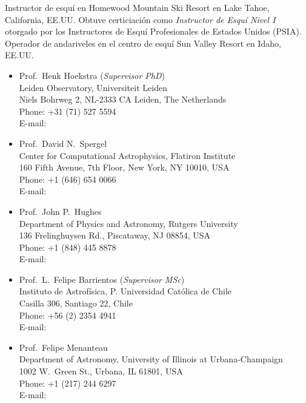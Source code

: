 \documentclass[11pt]{article}
\begin{document}

 Instructor de esquí en Homewood Mountain Ski Resort en 
Lake Tahoe, California, EE.UU. Obtuve certiciación como \emph{Instructor de 
Esquí Nivel I} otorgado por los Instructores de Esquí Profesionales de Estados 
Unidos (PSIA).\\
 Operador de andariveles en el centro de 
esquí Sun Valley Resort en Idaho, EE.UU.\\



\begin{itemize}
 \item Prof.~Henk Hoekstra (\textit{Supervisor PhD})\\
       Leiden Observatory, Universiteit Leiden\\
       Niels Bohrweg 2, NL-2333 CA Leiden, The Netherlands\\
       Phone: +31 (71) 527 5594\\
       E-mail: 
 \item Prof.~David N.~Spergel\\
       Center for Computational Astrophysics, Flatiron Institute\\
       160 Fifth Avenue, 7th Floor, New York, NY 10010, USA\\
       Phone: +1 (646) 654 0066\\
       E-mail: 
 \item Prof.~John P.~Hughes\\
       Department of Physics and Astronomy, Rutgers University\\
       136 Frelinghuysen Rd., Piscataway, NJ 08854, USA\\
       Phone: +1 (848) 445 8878\\
       E-mail: 
 \item Prof.~L.~Felipe Barrientos (\textit{Supervisor MSc})\\
       Instituto de Astrof\'isica, P. Universidad Cat\'olica de Chile\\
       Casilla 306, Santiago 22, Chile\\
       Phone: +56 (2) 2354 4941\\
       E-mail: 
 \item Prof.~Felipe Menanteau\\
       Department of Astronomy, University of Illinois at Urbana-Champaign\\
       1002 W.\ Green St., Urbana, IL 61801, USA\\
       Phone: +1 (217) 244 6297\\
       E-mail: 
\end{itemize}
\end{document}
